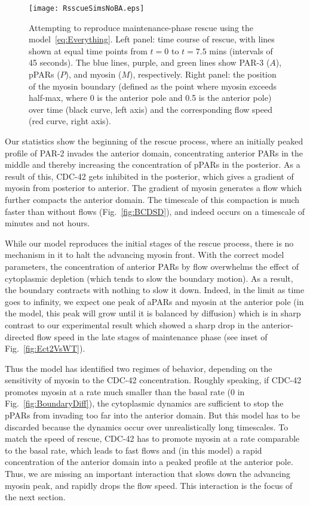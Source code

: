 \documentclass[11pt]{article}
\newcommand{\6}[1]{#1_{\text{6}}}
\newcommand{\3}[1]{#1_{\text{3}}}
\begin{document}
\begin{figure}
\centering
\texttt{[image: RsscueSimsNoBA.eps]}
\caption{\label{fig:RescueNoBA}Attempting to reproduce maintenance-phase rescue using the model\ \eqref{eq:Everything}. Left panel: time course of rescue, with lines shown at equal time points from $t=0$ to $t=7.5$ mins (intervals of 45 seconds). The blue lines, purple, and green lines show PAR-3 ($A$), pPARs ($P$), and myosin ($M$), respectively. Right panel: the position of the myosin boundary (defined as the point where myosin exceeds half-max, where 0 is the anterior pole and 0.5 is the anterior pole) over time (black curve, left axis) and the corresponding flow speed (red curve, right axis). }
\end{figure}


Our statistics show the beginning of the rescue process, where an initially peaked profile of PAR-2 invades the anterior domain, concentrating anterior PARs in the middle and thereby increasing the concentration of pPARs in the posterior. As a result of this, CDC-42 gets inhibited in the posterior, which gives a gradient of myosin from posterior to anterior. The gradient of myosin generates a flow which further compacts the anterior domain. The timescale of this compaction is much faster than without flows (Fig.\ \ref{fig:BCDSD}), and indeed occurs on a timescale of minutes and not hours.

While our model reproduces the initial stages of the rescue process, there is no mechanism in it to halt the advancing myosin front. With the correct model parameters, the concentration of anterior PARs by flow overwhelms the effect of cytoplasmic depletion (which tends to slow the boundary motion). As a result, the boundary contracts with nothing to slow it down. Indeed, in the limit as time goes to infinity, we expect one peak of aPARs and myosin at the anterior pole (in the model, this peak will grow until it is balanced by diffusion) which is in sharp contrast to our experimental result which showed a sharp drop in the anterior-directed flow speed in the late stages of maintenance phase (see inset of Fig.\ \ref{fig:Ect2VsWT}).

Thus the model has identified two regimes of behavior, depending on the sensitivity of myosin to the CDC-42 concentration. Roughly speaking, if CDC-42 promotes myosin at a rate much smaller than the basal rate (0 in Fig.\ \ref{fig:BoundaryDiff}), the cytoplasmic dynamics are sufficient to stop the pPARs from invading too far into the anterior domain. But this model has to be discarded because the dynamics occur over unrealistically long timescales. To match the speed of rescue, CDC-42 has to promote myosin at a rate comparable to the basal rate, which leads to fast flows and (in this model) a rapid concentration of the anterior domain into a peaked profile at the anterior pole. Thus, we are missing an important interaction that slows down the advancing myosin peak, and rapidly drops the flow speed. This interaction is the focus of the next section.
\end{document}
